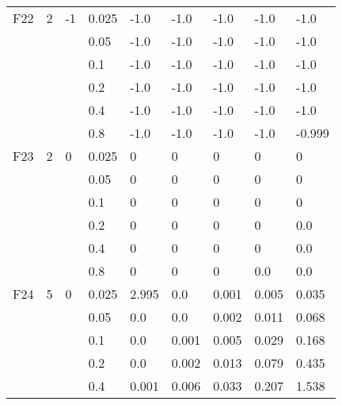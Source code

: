 \begin{longtable}{|l|l|l|l|l|l|l|l|l|}
F22            & 2   & -1       & 0.025          & -1.0       & -1.0       & -1.0       & -1.0       & -1.0       \\
\cmidrule{4-9} &     &          & 0.05           & -1.0       & -1.0       & -1.0       & -1.0       & -1.0       \\
\cmidrule{4-9} &     &          & 0.1            & -1.0       & -1.0       & -1.0       & -1.0       & -1.0       \\
\cmidrule{4-9} &     &          & 0.2            & -1.0       & -1.0       & -1.0       & -1.0       & -1.0       \\
\cmidrule{4-9} &     &          & 0.4            & -1.0       & -1.0       & -1.0       & -1.0       & -1.0       \\
\cmidrule{4-9} &     &          & 0.8            & -1.0       & -1.0       & -1.0       & -1.0       & -0.999     \\ \midrule
F23            & 2   & 0        & 0.025          & 0          & 0          & 0          & 0          & 0          \\
\cmidrule{4-9} &     &          & 0.05           & 0          & 0          & 0          & 0          & 0          \\
\cmidrule{4-9} &     &          & 0.1            & 0          & 0          & 0          & 0          & 0          \\
\cmidrule{4-9} &     &          & 0.2            & 0          & 0          & 0          & 0          & 0.0        \\
\cmidrule{4-9} &     &          & 0.4            & 0          & 0          & 0          & 0          & 0.0        \\
\cmidrule{4-9} &     &          & 0.8            & 0          & 0          & 0          & 0.0        & 0.0        \\ \midrule
F24            & 5   & 0        & 0.025          & 2.995      & 0.0        & 0.001      & 0.005      & 0.035      \\
\cmidrule{4-9} &     &          & 0.05           & 0.0        & 0.0        & 0.002      & 0.011      & 0.068      \\
\cmidrule{4-9} &     &          & 0.1            & 0.0        & 0.001      & 0.005      & 0.029      & 0.168      \\
\cmidrule{4-9} &     &          & 0.2            & 0.0        & 0.002      & 0.013      & 0.079      & 0.435      \\
\cmidrule{4-9} &     &          & 0.4            & 0.001      & 0.006      & 0.033      & 0.207      & 1.538      \\

\end{longtable}
